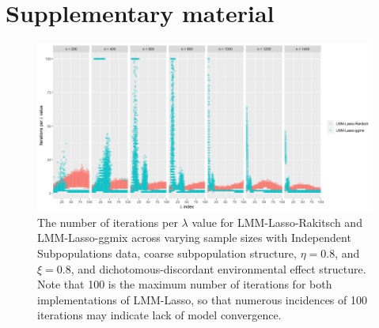 \section{Supplementary material}

\begin{figure}[H]
    \centering
    \includegraphics[scale = 0.45]{figures/niter_perLambda_point.png}
    \caption{The number of iterations per $\lambda$ value for LMM-Lasso-Rakitsch and LMM-Lasso-ggmix across varying sample sizes with Independent Subpopulations data, coarse subpopulation structure, $\eta = 0.8$, and $\xi = 0.8$, and dichotomous-discordant environmental effect structure. Note that 100 is the maximum number of iterations for both implementations of LMM-Lasso, so that numerous incidences of 100 iterations may indicate lack of model convergence.}
    \label{fig:s4}
\end{figure}